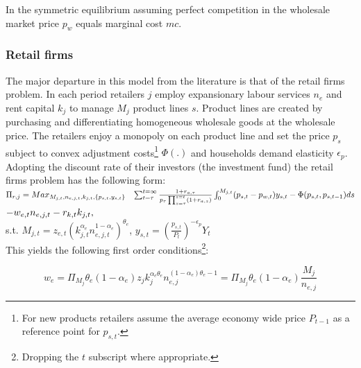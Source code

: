 \documentclass[12pt]{article}
\begin{document}
In the symmetric equilibrium assuming perfect competition in the wholesale market price $p_{w}$ equals marginal cost $mc$. 

\subsubsection{Retail firms}

The major departure in this model from the literature is that of the retail firms problem. In each period retailers $j$ employ expansionary labour services $n_{e}$ and rent capital $k_{j}$ to manage  $M_{j}$ product lines $s$. Product lines are created by purchasing and differentiating homogeneous wholesale goods at the wholesale price. The retailers enjoy a monopoly on each product line and set the price $p_{s}$ subject to convex adjustment costs\footnote{For new products retailers assume the average economy wide price $P_{t-1}$ as a reference point for $p_{s,t}$.} $\Phi(.)$ and households demand elasticity $\epsilon_{p}$. Adopting the discount rate of their investors (the investment fund) the retail firms problem has the following form: \\


$\Pi_{r,j}=Max_{M_{j,t},n_{e,j,t},k_{j,t},\left\{p_{s,t},y_{s,t}\right\}} \hspace{3mm}\sum_{t=\tau}^{t=\infty} \frac{1+r_{a,\tau}}{p_{\tau} \prod_{z=\tau}^{z=t}(1+r_{a,z})}  \int_{0}^{M_{j,t}} (p_{s,t}-p_{w,t})y_{s,t} - \Phi(p_{s,t},p_{s,t-1}) ds$ \\ $-w_{e,t}n_{e,j,t}-r_{k,t}k_{j,t}, \hspace{3mm} $ \\

s.t. \hspace{3mm} $M_{j,t}=z_{e,t} \left( k_{j,t}^{\alpha_{e}} n_{e,j,t}^{1-\alpha_{e}} \right)^{\theta_{e}}$,
     \hspace{3mm} $y_{s,t}=\left( \frac{p_{s,t}}{P_{t}} \right) ^{-\epsilon_{p}}Y_{t} $ \\
\begin{equation}
\end{equation}
This yields the following first order conditions\footnote{Dropping the $t$ subscript where appropriate.}:

\begin{equation}
w_{e}=\Pi_{M_{j}}\theta_{e}(1-\alpha_{e}) z_{j} k_{j}^{\alpha_{e}\theta_{e}} n_{e,j}^{(1-\alpha_{e})\theta_{e}-1} =     \Pi_{M_{j}}\theta_{e}(1-\alpha_{e})\frac{M_{j}}{n_{e,j}}
\label{eq:firm3}
\end{equation}
\end{document}
